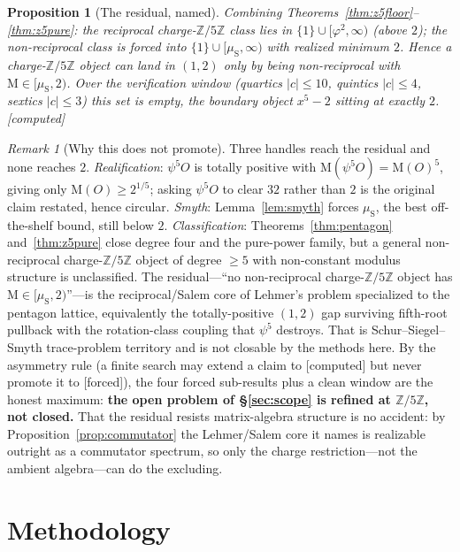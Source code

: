 \documentclass[11pt]{article}
\newtheorem{proposition}[theorem]{Proposition}
\theoremstyle{definition}
\theoremstyle{remark}
\newtheorem{remark}[theorem]{Remark}
\newcommand{\Mah}{\mathrm{M}}
\newcommand{\Z}{\mathbb{Z}}
\newcommand{\Adams}[1]{\psi^{#1}}
\newcommand{\gold}{\varphi}
\newcommand{\Zmod}[1]{\Z/#1\Z}
\newcommand{\status}[1]{{\small\textsf{[#1]}}}
\newcommand{\forced}{\status{forced}}
\newcommand{\computed}{\status{computed}}
\newcommand{\muS}{\mu_{\mathrm{S}}}
\begin{document}
\begin{proposition}[The residual, named]\label{prop:z5residual}
Combining Theorems~\ref{thm:z5floor}--\ref{thm:z5pure}: the reciprocal charge-$\Zmod5$ class
lies in $\{1\}\cup[\gold^{2},\infty)$ (above $2$); the non-reciprocal class is forced into
$\{1\}\cup[\muS,\infty)$ with realized minimum $2$. Hence a charge-$\Zmod5$ object can land in
$(1,2)$ \emph{only} by being non-reciprocal with $\Mah\in[\muS,2)$. Over the verification window
(quartics $|c|\le10$, quintics $|c|\le4$, sextics $|c|\le3$) this set is empty, the boundary
object $x^{5}-2$ sitting at exactly $2$. \computed{}
\end{proposition}
\begin{remark}[Why this does not promote]
Three handles reach the residual and none reaches $2$. \emph{Realification}: $\Adams5O$ is
totally positive with $\Mah(\Adams5O)=\Mah(O)^{5}$, giving only $\Mah(O)\ge2^{1/5}$; asking
$\Adams5O$ to clear $32$ rather than $2$ is the original claim restated, hence circular.
\emph{Smyth}: Lemma~\ref{lem:smyth} forces $\muS$, the best off-the-shelf bound, still below
$2$. \emph{Classification}: Theorems~\ref{thm:pentagon} and~\ref{thm:z5pure} close degree four
and the pure-power family, but a general non-reciprocal charge-$\Zmod5$ object of degree $\ge5$
with non-constant modulus structure is unclassified. The residual---``no non-reciprocal
charge-$\Zmod5$ object has $\Mah\in[\muS,2)$''---is the reciprocal/Salem core of Lehmer's
problem specialized to the pentagon lattice, equivalently the totally-positive $(1,2)$ gap
surviving fifth-root pullback with the rotation-class coupling that $\Adams5$ destroys. That is
Schur--Siegel--Smyth trace-problem territory and is not closable by the methods here. By the
asymmetry rule (a finite search may extend a claim to \computed{} but never promote it to
\forced{}), the four forced sub-results plus a clean window are the honest maximum:
\textbf{the open problem of \S\ref{sec:scope} is refined at $\Zmod5$, not closed.} That the
residual resists matrix-algebra structure is no accident: by Proposition~\ref{prop:commutator}
the Lehmer/Salem core it names is realizable outright as a commutator spectrum, so only the
charge restriction---not the ambient algebra---can do the excluding.
\end{remark}

\section{Methodology}\label{sec:method}
\end{document}
